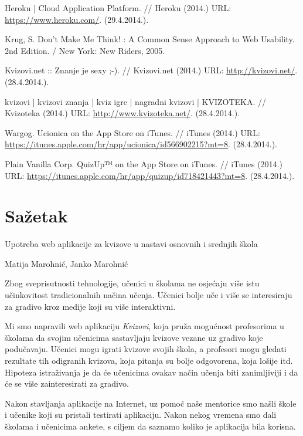 \documentclass[11pt]{scrreprt}
\begin{document}
\begin{thebibliography}{99}
   Heroku | Cloud Application Platform. // Heroku (2014.) URL:
    \url{https://www.heroku.com/}. (29.4.2014.).

   Krug, S. Don’t Make Me Think! : A Common Sense Approach to
    Web Usability. 2nd Edition. / New York: New Riders, 2005.

   Kvizovi.net :: Znanje je sexy ;-). // Kvizovi.net (2014.)
    URL: \url{http://kvizovi.net/}. (28.4.2014.).

   kvizovi | kvizovi znanja | kviz igre | nagradni kvizovi |
    KVIZOTEKA. // Kvizoteka (2014.) URL: \url{http://www.kvizoteka.net/}.
    (28.4.2014.).

   Wargog. Ucionica on the App Store on iTunes. // iTunes
    (2014.) URL:
    \url{https://itunes.apple.com/hr/app/ucionica/id566902215?mt=8}.
    (28.4.2014.).

   Plain Vanilla Corp. QuizUp™ on the App Store on iTunes. //
    iTunes (2014.) URL:
    \url{https://itunes.apple.com/hr/app/quizup/id718421443?mt=8}. (28.4.2014.).

\end{thebibliography}

\chapter{Sažetak}

Upotreba web aplikacije za kvizove u nastavi osnovnih i srednjih škola

Matija Marohnić, Janko Marohnić

Zbog sveprisutnosti tehnologije, učenici u školama ne osjećaju više istu
učinkovitost tradicionalnih načina učenja. Učenici bolje uče i više se
interesiraju za gradivo kroz medije koji su više interaktivni.

Mi smo napravili web aplikaciju \textit{Kvizovi}, koja pruža mogućnost
profesorima u školama da svojim učenicima sastavljaju kvizove vezane uz gradivo
koje podučavaju. Učenici mogu igrati kvizove svojih škola, a profesori mogu
gledati rezultate tih odigranih kvizova, koja pitanja su bolje odgovorena, koja
lošije itd. Hipoteza istraživanja je da će učenicima ovakav način učenja biti
zanimljiviji i da će se više zainteresirati za gradivo.

Nakon stavljanja aplikacije na Internet, uz pomoć naše mentorice smo našli
škole i učenike koji su pristali testirati aplikaciju. Nakon nekog vremena smo
dali školama i učenicima ankete, s ciljem da saznamo koliko je aplikacija bila
korisna.
\end{document}
